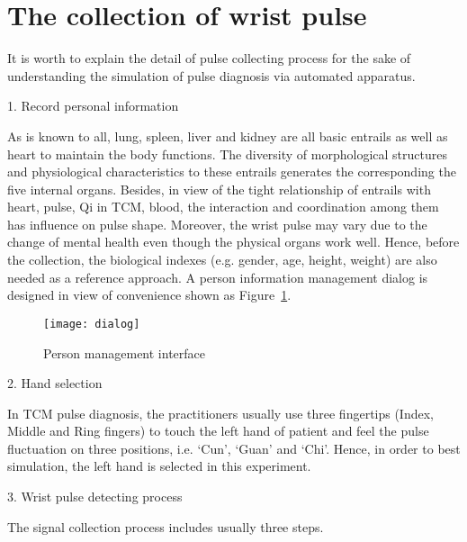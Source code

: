 \section{The collection of wrist pulse}
It is worth to explain the detail of pulse collecting process for the
sake of understanding the simulation of pulse diagnosis via
automated apparatus. 
\par 1. Record personal information 
\par As is known to all, lung, spleen, liver and
kidney are all basic entrails as well as heart to maintain the
body functions. The diversity of morphological structures and
physiological characteristics to these entrails generates the
corresponding the five internal organs. Besides, in view of the tight
relationship of entrails with heart, pulse, Qi in TCM, blood, the
interaction and coordination among them has influence on pulse shape.
Moreover, the wrist pulse may vary due to the change of mental health
even though the physical organs work well. Hence, before the
collection, the biological indexes (e.g. gender, age, height, weight)
are also needed as a reference approach. A person information
management dialog is designed in view of convenience
shown as Figure~\ref{fig:dialog}.
\begin{figure}[htpb]
    \begin{center}
        \texttt{[image: dialog]}
    \end{center}
    \caption{Person management interface}
    \label{fig:dialog}
\end{figure}
\par 2. Hand selection
\par In TCM pulse diagnosis, the practitioners usually use three fingertips (Index,
Middle and Ring fingers) to touch the left hand of patient and feel
the pulse fluctuation on three positions, i.e. `Cun', `Guan' and
`Chi'. Hence, in order to best simulation, the left hand is selected
in this experiment.
\par 3. Wrist pulse detecting process 
\par  The signal collection process includes usually three
steps. 
